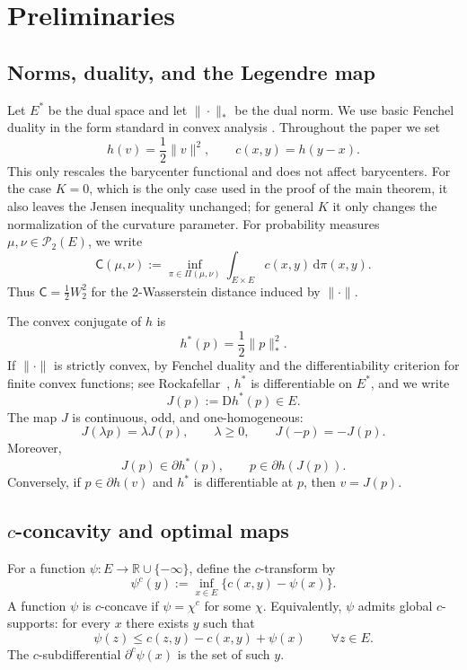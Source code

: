 \documentclass[a4paper,11pt]{article}
\numberwithin{equation}{section}
\newcommand{\R}{\mathbb{R}}
\newcommand{\dd}{\mathrm d}
\newcommand{\D}{\mathrm D}
\newcommand{\cP}{\mathcal P}
\begin{document}
	
	\section{Preliminaries}\label{sec:preliminaries}
	
	\subsection{Norms, duality, and the Legendre map}\label{subsec:norms-duality}
	
	Let $E^*$ be the dual space and let $\|\cdot\|_*$ be the dual norm. We use basic Fenchel duality in the form standard in convex analysis \cite{Rockafellar1970}. Throughout the paper we set
	\[
	h(v)=\frac12\|v\|^2,
	\qquad c(x,y)=h(y-x).
	\]
	This only rescales the barycenter functional and does not affect barycenters. For the case \(K=0\), which is the only case used in the proof of the main theorem, it also leaves the Jensen inequality unchanged; for general \(K\) it only changes the normalization of the curvature parameter.
	For probability measures \(\mu,\nu\in\cP_2(E)\), we write
	\[
	\mathsf C(\mu,\nu):=\inf_{\pi\in\Pi(\mu,\nu)}
	\int_{E\times E} c(x,y)\,\dd\pi(x,y).
	\]
	Thus \(\mathsf C=\frac12 W_2^2\) for the 2-Wasserstein distance induced by \(\|\cdot\|\).
	
	The convex conjugate of $h$ is
	\[
	h^*(p)=\frac12\|p\|_*^2.
	\]
	If $\|\cdot\|$ is strictly convex, by Fenchel duality and the differentiability criterion for finite convex functions; see Rockafellar~\cite[Theorems 23.5 and 25.1]{Rockafellar1970}, $h^*$ is differentiable on $E^*$, and we write
	\[
	J(p):=\D h^*(p)\in E.
	\]
	The map $J$ is continuous, odd, and one-homogeneous:
	\[
	J(\lambda p)=\lambda J(p),\qquad \lambda\ge0,
	\qquad J(-p)=-J(p).
	\]
	Moreover,
	\[
	J(p)\in\partial h^*(p),
	\qquad p\in\partial h(J(p)).
	\]
	Conversely, if $p\in\partial h(v)$ and $h^*$ is differentiable at $p$, then $v=J(p)$.
	
	\subsection{$c$-concavity and optimal maps}\label{subsec:c-concavity}
	
	For a function $\psi:E\to\R\cup\{-\infty\}$, define the $c$-transform by
	\[
	\psi^c(y):=\inf_{x\in E}\{c(x,y)-\psi(x)\}.
	\]
	A function $\psi$ is $c$-concave if $\psi=\chi^c$ for some $\chi$. Equivalently, $\psi$ admits global $c$-supports: for every $x$ there exists $y$ such that
	\[
	\psi(z)\le c(z,y)-c(x,y)+\psi(x)
	\qquad\forall z\in E.
	\]
	The $c$-subdifferential $\partial^c\psi(x)$ is the set of such $y$.
	
\end{document}
